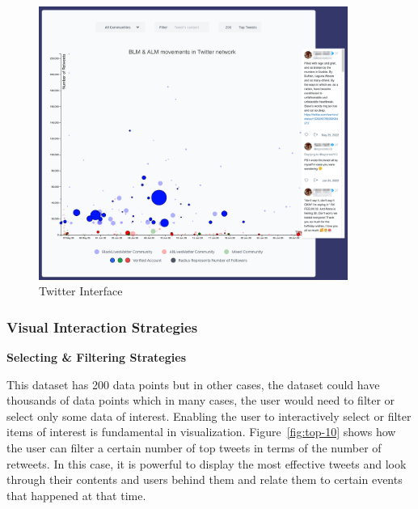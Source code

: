 \begin{figure}[H]
\centering
\captionsetup{justification=centering}
\includegraphics[width=0.9\textwidth]{Report-latex/tex_files/pics/example/twitter.png}
\caption{Twitter Interface}
\label{fig:e-twitter}
\end{figure}


\subsubsection{Visual Interaction Strategies}

\textbf{Selecting \& Filtering Strategies}

This dataset has 200 data points but in other cases, the dataset could have thousands of data points which in many cases, the user would need to filter or select only some data of interest. Enabling the user to interactively select or filter items of interest is fundamental in visualization. Figure~\ref{fig:top-10} shows how the user can filter a certain number of top tweets in terms of the number of retweets. In this case, it is powerful to display the most effective tweets and look through their contents and users behind them and relate them to certain events that happened at that time. 

